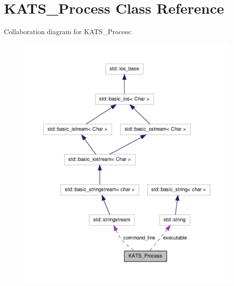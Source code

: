 \hypertarget{classKATS__Process}{
\section{KATS\_\-Process Class Reference}
\label{d5/ddc/classKATS__Process}
}


Collaboration diagram for KATS\_\-Process:
\nopagebreak
\begin{figure}[H]
\begin{center}
\leavevmode
\includegraphics[width=400pt]{db/d59/classKATS__Process__coll__graph}
\end{center}
\end{figure}
